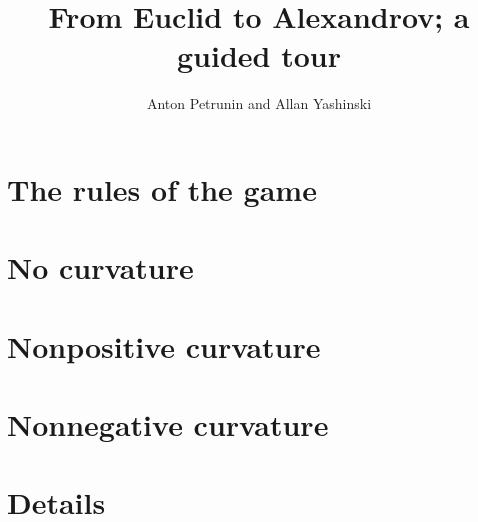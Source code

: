 \documentclass[oneside,b5paper]{book}
\begin{document}
\frontmatter
\title{From Euclid to Alexandrov; a guided tour}
\author{Anton Petrunin and Allan Yashinski}
\date{}
\maketitle
\tableofcontents

\mainmatter


\part{The rules of the game}




%

\part{No curvature}

%
\part{Nonpositive curvature}



\part{Nonnegative curvature}




\part{Details}






\end{document}
